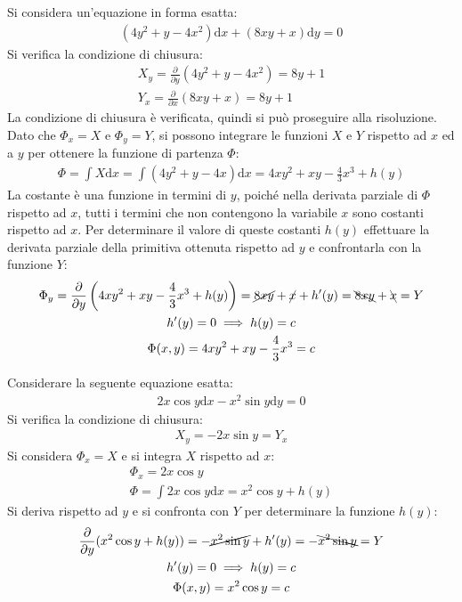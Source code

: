 \documentclass{article}
\newcommand{\df}{\mathrm{d}}
\numberwithin{equation}{subsection}
\begin{document}
Si considera un'equazione in forma esatta:
\begin{gather*}
    (4y^2+y-4x^2)\df x+(8xy+x)\df y=0
\end{gather*}
Si verifica la condizione di chiusura:
\begin{gather*}
    X_y=\frac{\partial}{\partial y}(4y^2+y-4x^2)=8y+1\\
    Y_x=\frac{\partial}{\partial x}(8xy+x)=8y+1
\end{gather*}
La condizione di chiusura è verificata, quindi si può proseguire alla risoluzione. Dato che $\Phi_x=X$ e $\Phi_y=Y$, si possono integrare le funzioni $X$ e $Y$ rispetto ad $x$ ed a $y$ per ottenere la funzione di partenza $\Phi$:
\begin{gather*}
    \Phi=\int X\df x=\int(4y^2+y-4x)\df x=4xy^2+xy-\frac{4}{3}x^3+h(y)
\end{gather*}
La costante è una funzione in termini di $y$, poiché nella derivata parziale di $\Phi$ rispetto ad $x$, tutti i termini che non contengono la variabile $x$ sono costanti rispetto ad $x$. Per determinare il valore di queste costanti $h(y)$ effettuare la derivata parziale della primitiva ottenuta rispetto ad $y$ e confrontarla con la funzione $Y$:
\begin{gather*}
    \Phi_y=\frac{\partial}{\partial y}\left(4xy^2+xy-\frac{4}{3}x^3+h(y)\right)=\cancel{8xy}+\cancel{x}+h'(y)=\bcancel{8xy}+\bcancel{x}=Y\\
    h'(y)=0\implies h(y)=c\\
    \Phi(x,y)=4xy^2+xy-\frac{4}{3}x^3=c
\end{gather*}



Considerare la seguente equazione esatta:
\begin{gather*}
    2x\cos y\df x-x^2\sin y\df y=0
\end{gather*}
Si verifica la condizione di chiusura:
\begin{gather*}
    X_y=-2x\sin y=Y_x
\end{gather*}
Si considera $\Phi_x=X$ e si integra $X$ rispetto ad $x$:
\begin{gather*}
    \Phi_x=2x\cos y\\
    \Phi=\int 2x\cos y\df x=x^2\cos y+h(y)
\end{gather*}
Si deriva rispetto ad $y$ e si confronta con $Y$ per determinare la funzione $h(y)$:
\begin{gather*}
    \frac{\partial}{\partial y}(x^2\cos y+h(y))=-\cancel{x^2\sin y}+h'(y)=-\bcancel{x^2\sin y}=Y\\
    h'(y)=0\implies h(y)=c\\
    \Phi(x,y)=x^2\cos y=c
\end{gather*}
\end{document}
